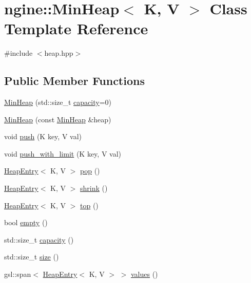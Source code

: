 \hypertarget{classngine_1_1MinHeap}{}\section{ngine\+:\+:Min\+Heap$<$ K, V $>$ Class Template Reference}
\label{classngine_1_1MinHeap}


{\ttfamily \#include $<$heap.\+hpp$>$}

\subsection*{Public Member Functions}
\begin{DoxyCompactItemize}
\item 
\hyperlink{classngine_1_1MinHeap_a93985caaf1556618510ebcc73471b1de}{Min\+Heap} (std\+::size\+\_\+t \hyperlink{classngine_1_1MinHeap_af42bfc0b83ceca5c2486865d79a79871}{capacity}=0)
\item 
\hyperlink{classngine_1_1MinHeap_ac11539354d85e877e6493452bd155cb2}{Min\+Heap} (const \hyperlink{classngine_1_1MinHeap}{Min\+Heap} \&heap)
\item 
void \hyperlink{classngine_1_1MinHeap_a97dfc8d0ded23444c31e0f4f1823edf1}{push} (K key, V val)
\item 
void \hyperlink{classngine_1_1MinHeap_a8fc4e9e30ebf867dd1ece89b1d69340c}{push\+\_\+with\+\_\+limit} (K key, V val)
\item 
\hyperlink{structngine_1_1HeapEntry}{Heap\+Entry}$<$ K, V $>$ \hyperlink{classngine_1_1MinHeap_a21a3fe9a338552baecf2cff96d22bcf0}{pop} ()
\item 
\hyperlink{structngine_1_1HeapEntry}{Heap\+Entry}$<$ K, V $>$ \hyperlink{classngine_1_1MinHeap_adcb0b5924740d7c962386e0b80cafdfc}{shrink} ()
\item 
\hyperlink{structngine_1_1HeapEntry}{Heap\+Entry}$<$ K, V $>$ \hyperlink{classngine_1_1MinHeap_a9766a8a89e8a0e91a97cbe274feefeaf}{top} ()
\item 
bool \hyperlink{classngine_1_1MinHeap_a7850bf0a2331613376935f2da1cde217}{empty} ()
\item 
std\+::size\+\_\+t \hyperlink{classngine_1_1MinHeap_af42bfc0b83ceca5c2486865d79a79871}{capacity} ()
\item 
std\+::size\+\_\+t \hyperlink{classngine_1_1MinHeap_a20d4550e309886329c6b306ec481c75c}{size} ()
\item 
gsl\+::span$<$ \hyperlink{structngine_1_1HeapEntry}{Heap\+Entry}$<$ K, V $>$ $>$ \hyperlink{classngine_1_1MinHeap_a69d812170774044fb92f695c9249bdfb}{values} ()
\end{DoxyCompactItemize}
